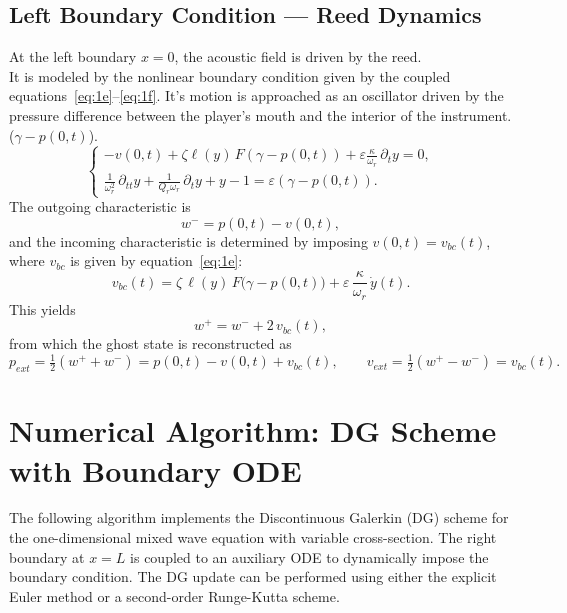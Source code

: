 \documentclass[11pt,a4paper]{report}
\theoremstyle{plain}
\theoremstyle{definition}
\begin{document}
\subsection{Left Boundary Condition — Reed Dynamics}

At the left boundary $x=0$, the acoustic field is driven by the reed. \\
It is modeled by the nonlinear boundary condition given by the coupled equations~\eqref{eq:1e}--\eqref{eq:1f}.
It's motion is approached as an oscillator driven by the pressure difference between the player's mouth and the interior of the instrument. ($\gamma - p(0,t)$). \\
\begin{equation}
    \begin{cases}
    -v(0,t) + \zeta \ell(y)\,F(\gamma - p(0,t)) + \varepsilon\frac{\kappa}{\omega_r}\,\partial_t y = 0,
    \\[0.4em]
    \frac{1}{\omega_r^2}\,\partial_{tt} y + \frac{1}{Q_r\omega_r}\,\partial_t y + y - 1 = \varepsilon(\gamma - p(0,t)).
    \end{cases}
\end{equation}
The outgoing characteristic is
\begin{equation}
    w^- = p(0,t) - v(0,t),
\end{equation}
and the incoming characteristic is determined by imposing $v(0,t) = v_{bc}(t)$,
where $v_{bc}$ is given by equation~\eqref{eq:1e}:
\begin{equation}
    v_{bc}(t) = \zeta\,\ell(y)\,F\!\bigl(\gamma - p(0,t)\bigr)
    + \varepsilon\,\frac{\kappa}{\omega_r}\,\dot{y}(t).
\end{equation}
This yields
\begin{equation}
    w^+ = w^- + 2\,v_{bc}(t),
\end{equation}
from which the ghost state is reconstructed as
\begin{equation}
    p_{ext} = \tfrac{1}{2}(w^+ + w^-) = p(0,t) - v(0,t) + v_{bc}(t),
    \qquad
    v_{ext} = \tfrac{1}{2}(w^+ - w^-) = v_{bc}(t).
\end{equation}

\section{Numerical Algorithm: DG Scheme with Boundary ODE}

The following algorithm implements the Discontinuous Galerkin (DG) scheme 
for the one-dimensional mixed wave equation with variable cross-section. 
The right boundary at $x=L$ is coupled to an auxiliary ODE to dynamically 
impose the boundary condition. The DG update can be performed using either 
the explicit Euler method or a second-order Runge-Kutta scheme.
\end{document}
